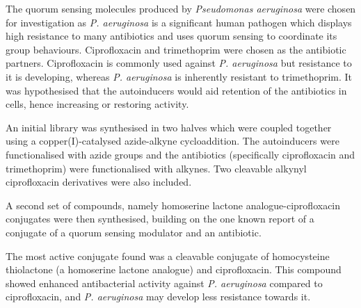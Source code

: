 The quorum sensing molecules produced by \textit{Pseudomonas aeruginosa} were chosen for investigation as \textit{P. aeruginosa} is a significant human pathogen which displays high resistance to many antibiotics and uses quorum sensing to coordinate its group behaviours. 
Ciprofloxacin and trimethoprim were chosen as the antibiotic partners.
Ciprofloxacin is commonly used against \textit{P. aeruginosa} but resistance to it is developing, whereas \textit{P. aeruginosa} is inherently resistant to trimethoprim.
It was hypothesised that the autoinducers would aid retention of the antibiotics in cells, hence increasing or restoring activity.

An initial library was synthesised in two halves which were coupled together using a copper(I)-catalysed azide-alkyne cycloaddition. 
The autoinducers were functionalised with azide groups and the antibiotics (specifically ciprofloxacin and trimethoprim) were functionalised with alkynes. 
Two cleavable alkynyl ciprofloxacin derivatives were also included.

A second set of compounds, namely homoserine lactone analogue-ciprofloxacin conjugates were then synthesised, building on the one known report of a conjugate of a quorum sensing modulator and an antibiotic.

The most active conjugate found was a cleavable conjugate of homocysteine thiolactone (a homoserine lactone analogue) and ciprofloxacin. This compound showed enhanced antibacterial activity against \textit{P. aeruginosa} compared to ciprofloxacin, and \textit{P. aeruginosa} may develop less resistance towards it.


\newpage